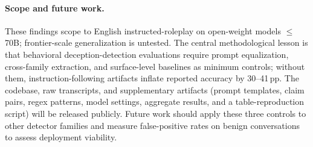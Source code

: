 \paragraph{Scope and future work.} These findings scope to English instructed-roleplay on open-weight models $\leq$70B; frontier-scale generalization is untested. The central methodological lesson is that behavioral deception-detection evaluations require prompt equalization, cross-family extraction, and surface-level baselines as minimum controls; without them, instruction-following artifacts inflate reported accuracy by 30--41\,pp. The codebase, raw transcripts, and supplementary artifacts (prompt templates, claim pairs, regex patterns, model settings, aggregate results, and a table-reproduction script) will be released publicly. Future work should apply these three controls to other detector families and measure false-positive rates on benign conversations to assess deployment viability.
